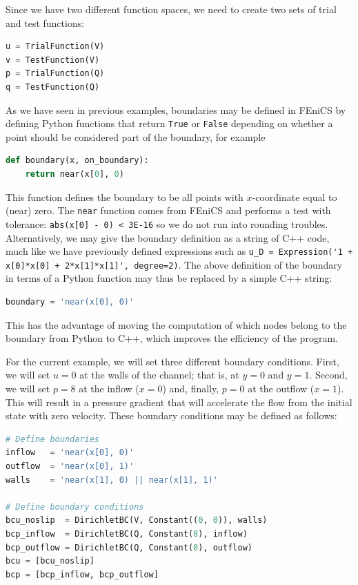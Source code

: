 \documentclass[graybox,envcountchap,sectrefs,final]{svmonodo}
\begin{document}
Since we have two different function spaces, we need to create two sets
of trial and test functions:

\begin{lstlisting}[language=Python,style=graycolor]
u = TrialFunction(V)
v = TestFunction(V)
p = TrialFunction(Q)
q = TestFunction(Q)
\end{lstlisting}


As we have seen in previous examples, boundaries may be defined in
FEniCS by defining Python functions that return \texttt{True} or \texttt{False}
depending on whether a point should be considered part of the
boundary, for example

\begin{lstlisting}[language=Python,style=graycolor]
def boundary(x, on_boundary):
    return near(x[0], 0)
\end{lstlisting}
This function defines the boundary to be all points with
$x$-coordinate equal to (near) zero. The \texttt{near} function comes from
FEniCS and performs a test with tolerance: \texttt{abs(x[0] - 0) < 3E-16} so we
do not run into rounding troubles.  Alternatively, we may give the
boundary definition as a string of C++ code, much like we have
previously defined expressions such as \Verb!u_D = Expression('1 + x[0]*x[0] + 2*x[1]*x[1]', degree=2)!. The above definition of the boundary in
terms of a Python function may thus be replaced by a simple C++
string:

\begin{lstlisting}[language=Python,style=graycolor]
boundary = 'near(x[0], 0)'
\end{lstlisting}
This has the advantage of moving the computation of which nodes
belong to the boundary from Python to C++, which improves the efficiency
of the program.

For the current example, we will set three different boundary
conditions. First, we will set $u = 0$ at the walls of the channel;
that is, at $y = 0$ and $y = 1$. Second, we will set $p = 8$ at the
inflow ($x = 0$) and, finally, $p = 0$ at the outflow ($x = 1$). This
will result in a pressure gradient that will accelerate the flow from
the initial state with zero velocity. These boundary conditions may be
defined as follows:

\begin{lstlisting}[language=Python,style=graycolor]
# Define boundaries
inflow   = 'near(x[0], 0)'
outflow  = 'near(x[0], 1)'
walls    = 'near(x[1], 0) || near(x[1], 1)'

# Define boundary conditions
bcu_noslip  = DirichletBC(V, Constant((0, 0)), walls)
bcp_inflow  = DirichletBC(Q, Constant(8), inflow)
bcp_outflow = DirichletBC(Q, Constant(0), outflow)
bcu = [bcu_noslip]
bcp = [bcp_inflow, bcp_outflow]
\end{lstlisting}
\end{document}

